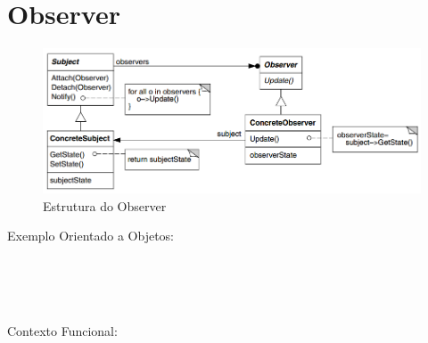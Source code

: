 \section{Observer}

\begin{figure}[htb]
	\caption{\label{observer_struct}Estrutura do Observer}
	\begin{center}
	    \includegraphics[scale=0.5]{5_padroes-contexto-funcional/5.3_comportamentais/5.3.07_observer/diagram.png}
	\end{center}
\end{figure}

Exemplo Orientado a Objetos:

\begin{lstlisting}[caption={Observer Orientação a Objetos},label=ooobserver]


    
\end{lstlisting}

Contexto Funcional:


\begin{lstlisting}[caption={Observer Funcional},label=fpobserver]
    

    
\end{lstlisting}